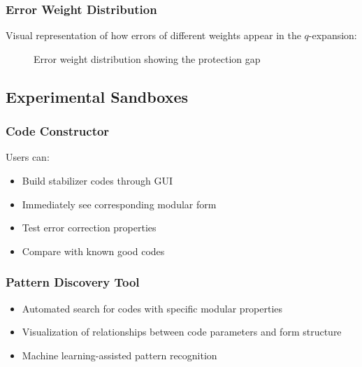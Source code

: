 \documentclass[11pt,a4paper]{article}
\begin{document}
\subsubsection{Error Weight Distribution}
Visual representation of how errors of different weights appear in the $q$-expansion:

\begin{figure}[h]
\centering
{}
\caption{Error weight distribution showing the protection gap}
\end{figure}

\subsection{Experimental Sandboxes}

\subsubsection{Code Constructor}
Users can:
\begin{itemize}
\item Build stabilizer codes through GUI
\item Immediately see corresponding modular form
\item Test error correction properties
\item Compare with known good codes
\end{itemize}

\subsubsection{Pattern Discovery Tool}
\begin{itemize}
\item Automated search for codes with specific modular properties
\item Visualization of relationships between code parameters and form structure
\item Machine learning-assisted pattern recognition
\end{itemize}
\end{document}
